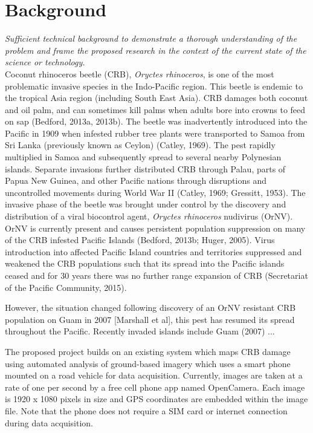 \documentclass[11pt,english,letterpaper]{scrartcl}
\begin{document}

\section{Background}

\textit{Sufficient technical background to demonstrate a thorough understanding of the problem and frame the proposed research in the context of the current state of the science or technology.}\\

Coconut rhinoceros beetle (CRB), \textit{Oryctes rhinoceros}, is one of the most problematic invasive species in the Indo-Pacific region. This beetle is endemic to the tropical Asia region (including South East Asia). CRB damages both coconut and oil palm, and can sometimes kill palms when adults bore into crowns to feed on sap (Bedford, 2013a, 2013b). The beetle was inadvertently introduced into the Pacific in 1909 when infested rubber tree plants were transported to Samoa from Sri Lanka (previously known as Ceylon) (Catley, 1969). The pest rapidly multiplied in Samoa and subsequently spread to several nearby Polynesian islands. Separate invasions further distributed CRB through Palau, parts of Papua New Guinea, and other Pacific nations through disruptions and uncontrolled movements during World War II (Catley, 1969; Gressitt, 1953). The invasive phase of the beetle was brought under control by the discovery and distribution of a viral biocontrol agent, \textit{Oryctes rhinoceros} nudivirus (OrNV). OrNV is currently present and causes persistent population suppression on many of the CRB infested Pacific Islands (Bedford, 2013b; Huger, 2005). Virus introduction into affected Pacific Island countries and territories suppressed and weakened the CRB populations such that its spread into the Pacific islands ceased and for 30 years there was no further range expansion of CRB (Secretariat of the Pacific Community, 2015). 

However, the situation changed following discovery of an OrNV resistant CRB population on Guam in 2007 [Marshall et al], this pest has resumed its spread throughout the Pacific. Recently invaded islands include Guam (2007) ... 

The proposed project builds on an existing system which maps CRB damage using automated analysis of ground-based imagery which uses a smart phone mounted on a road vehicle for data acquisition. Currently, images are taken at a rate of one per second by a free cell phone app named OpenCamera. Each image is 1920 x 1080 pixels in size and GPS coordinates are embedded within the image file. Note that the phone does not require a SIM card or internet connection during data acquisition. 
\end{document}
